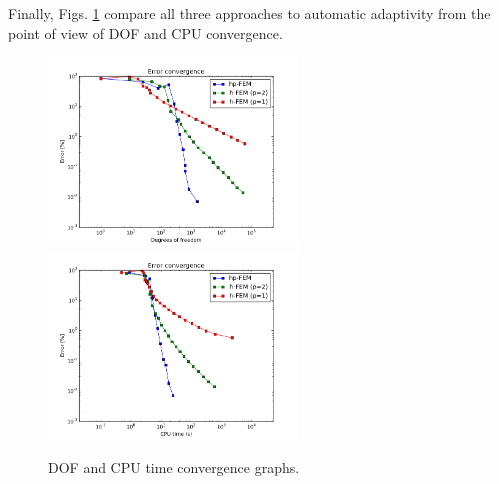 Finally, Figs. \ref{fig:nist-4-conv} compare all
three approaches to automatic adaptivity from the point
of view of DOF and CPU convergence.

\begin{figure}[!ht]
\centering
\includegraphics[height=5cm]{nist/nist-4/conv_dof_aniso.png}\ \
\includegraphics[height=5cm]{nist/nist-4/conv_cpu_aniso.png}
\caption{DOF and CPU time convergence graphs.}
\label{fig:nist-4-conv}
\end{figure}

